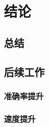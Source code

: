 \chapter{结论}
\label{chap:conclusion}

\section{总结}

\section{后续工作}
\subsection{准确率提升}
\subsection{速度提升}

